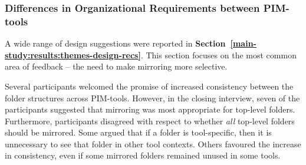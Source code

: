 \subsubsection{Differences in Organizational Requirements between PIM-tools}

A wide range of design suggestions were reported in \textbf{Section~\ref{main-study:results:themes-design-recs}}. %
This section focuses on the most common area of feedback -- the need to make mirroring more selective.

Several participants welcomed the promise of increased consistency between the folder structures across PIM-tools. However, in the closing interview, seven of the participants suggested that mirroring was most appropriate for top-level folders.
Furthermore, participants disagreed with respect to whether \textit{all} top-level folders should be mirrored. 
Some argued that if a folder is tool-specific, then it is unnecessary to see that folder in other tool contexts.  Others favoured the increase in consistency, even if some mirrored folders remained unused in some tools.

